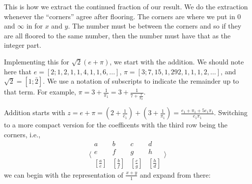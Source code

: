 \documentclass[12pt]{article}
\begin{document}
This is how we extract the continued fraction of our result. We do the extraction whenever the ``corners'' agree after flooring. The corners are where we put in 0 and $\infty$ in for $x$ and $y$. The number must be between the corners and so if they are all floored to the same number, then the number must have that as the integer part.

Implementing this for $\sqrt{2}(e + \pi)$, we start with the addition. We should note here that $e = [2; 1, 2, 1, 1, 4, 1, 1, 6, ...]$, $\pi = [3; 7, 15, 1, 292, 1, 1, 1, 2, \ldots]$, and $\sqrt{2} = [1; \bar{2}]$. We use a notation of subscripts to indicate the remainder up to that term. For example, $\pi = 3 + \frac{1}{\pi_1} =  3 + \frac{1}{7 + \frac{1}{\pi_2}}$. 

Addition starts with $z = e + \pi =  (2 + \frac{1}{e_1} ) + (3 + \frac{1}{\pi_1}) = \frac{e_1 + \pi_1 + 5 e_1 \pi_1}{e_1 \pi_1}$. Switching to a more compact version for the coefficents with the third row being the corners, i.e., 
$$\bigg\langle\begin{smallmatrix}
  a & b & c & d\\
  e & f & g & h \\
  [\frac{a}{e}] & [\frac{b}{f}] & [\frac{c}{g}] & [\frac{h}{d}] 
\end{smallmatrix}\bigg\rangle$$ we can begin with the representation of $\frac{x+y}{1}$ and expand from there: 
\end{document}
